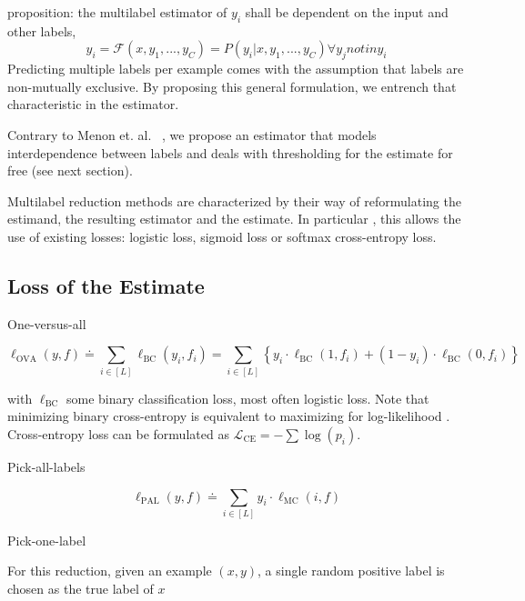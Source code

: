 proposition: the multilabel estimator of $y_i$ shall be dependent on the input and other labels,
\begin{equation}
  y_i = \mathcal{F}(x, y_1, ..., y_C) = P(y_i | x, y_1, ..., y_C) \forall y_j not in y_i
\end{equation}
Predicting multiple labels per example comes with the assumption that labels are non-mutually exclusive. By proposing this general formulation, we entrench that characteristic in the estimator.

Contrary to Menon et. al. ~\citep{multilabelReduction}, we propose an estimator that models interdependence between labels and deals with thresholding for the estimate for free (see next section).

Multilabel reduction methods are characterized by their way of reformulating the estimand, the resulting estimator and the estimate. In particular , this allows the use of existing losses: logistic loss, sigmoid loss or softmax cross-entropy loss.


\subsection{Loss of the Estimate}
\label{section:background:estimate}

One-versus-all

\begin{equation}
\ell_{\mathrm{OVA}}(y, f) \doteq \sum_{i \in[L]} \ell_{\mathrm{BC}}\left(y_{i}, f_{i}\right)=\sum_{i \in[L]}\left\{y_{i} \cdot \ell_{\mathrm{BC}}\left(1, f_{i}\right)+\left(1-y_{i}\right) \cdot \ell_{\mathrm{BC}}\left(0, f_{i}\right)\right\}
\end{equation}

with $\ell_{\mathrm{BC}}$ some binary classification loss, most often logistic loss.  Note that minimizing binary cross-entropy is equivalent to maximizing for log-likelihood
\cite[Section 4.3.4]{Bishop}. Cross-entropy loss can be formulated as \(\mathcal{L}_{\text {CE}}=-\sum \log \left(p_{i}\right)\).

Pick-all-labels

\begin{equation}
\ell_{\mathrm{PAL}}(y, f) \doteq \sum_{i \in[L]} y_{i} \cdot \ell_{\mathrm{MC}}(i, f)
\end{equation}

Pick-one-label

For this reduction, given an example $(x,y)$, a single random positive label is chosen as the true label of $x$


